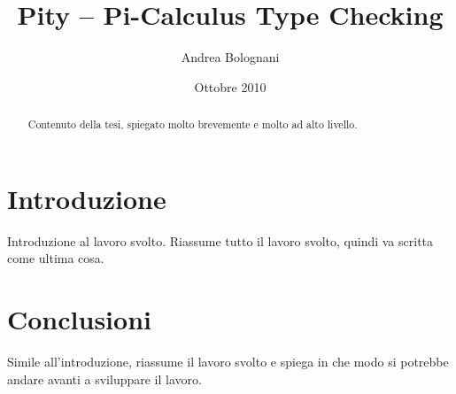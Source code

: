 \documentclass[a4paper]{article}
\begin{document}
\title{Pity -- Pi-Calculus Type Checking}
\author{Andrea Bolognani}
\date{Ottobre 2010}

\maketitle


\begin{abstract}
Contenuto della tesi, spiegato molto brevemente e molto ad alto livello.
\end{abstract}


\clearpage

\tableofcontents

\clearpage


\section{Introduzione}

Introduzione al lavoro svolto. Riassume tutto il lavoro svolto, quindi
va scritta come ultima cosa.









\section{Conclusioni}

Simile all'introduzione, riassume il lavoro svolto e spiega in che
modo si potrebbe andare avanti a sviluppare il lavoro.
\end{document}
